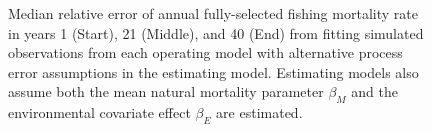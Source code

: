 \documentclass[
  12pt,
]{article}
\begin{document}
\begin{landscape}
\begin{figure}
\caption{Median relative error of annual fully-selected fishing mortality rate in years 1 (Start), 21 (Middle), and 40 (End) from fitting simulated observations from each operating model with alternative process error assumptions in the estimating model. Estimating models also assume both the mean natural mortality parameter $\beta_M$ and the environmental covariate effect $\beta_E$ are estimated.}\label{F_bias_M_estimated_beta_estimated}
\begin{center}
\end{center}
\end{figure}
\end{landscape}
\end{document}
